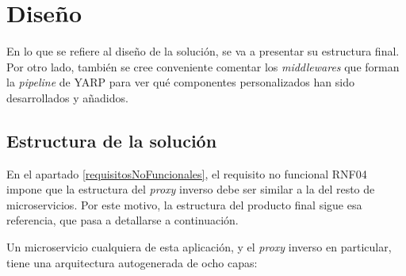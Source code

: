 \documentclass[11pt,spanish,listoffigures]{tfgetsinf}
\begin{document}
\newpage %


	\section{Diseño}

En lo que se refiere al diseño de la solución, se va a presentar su estructura final. Por otro lado, también se cree conveniente comentar los \emph{middlewares} que forman la \emph{pipeline} de YARP para ver qué componentes personalizados han sido desarrollados y añadidos.


		\subsection{Estructura de la solución} \label{estructuraSolucion}

En el apartado \ref{requisitosNoFuncionales}, el requisito no funcional RNF04 impone que la estructura del \emph{proxy} inverso debe ser similar a la del resto de microservicios. Por este motivo, la estructura del producto final sigue esa referencia, que pasa a detallarse a continuación.

Un microservicio cualquiera de esta aplicación, y el \emph{proxy} inverso en particular, tiene una arquitectura autogenerada de ocho capas:
\end{document}
